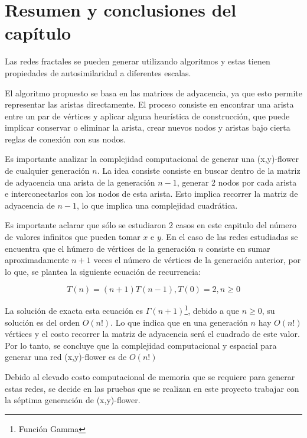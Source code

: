 \section{Resumen y conclusiones del capítulo}

Las redes fractales se pueden generar utilizando algoritmos y estas tienen propiedades de autosimilaridad a diferentes escalas.

El algoritmo propuesto se basa en las matrices de adyacencia, ya que esto permite representar las aristas directamente. El proceso consiste en encontrar una arista entre un par de vértices y aplicar alguna heurística de construcción, que puede implicar conservar o eliminar la arista, crear nuevos nodos y aristas bajo cierta reglas de conexión con sus nodos.

Es importante analizar la complejidad computacional de generar una (x,y)-flower de cualquier generación $n$. La idea consiste consiste en buscar dentro de la matriz de adyacencia una arista de la generación $n-1$, generar 2 nodos por cada arista e interconectarlos con los nodos de esta arista. Esto implica recorrer la matriz de adyacencia de $n-1$, lo que implica una complejidad cuadrática.

Es importante aclarar que sólo se estudiaron 2 casos en este capitulo del número de valores infinitos que pueden tomar $x$ e $y$. En el caso de las redes estudiadas se encuentra que el húmero de vértices de la generación $n$ consiste en sumar aproximadamente $n+1$ veces el número de vértices de la generación anterior, por lo que, se plantea la siguiente ecuación de recurrencia:

\begin{equation}
    T(n)=(n+1)T(n-1), T(0)=2, n \geq 0
\end{equation}

La solución de exacta esta ecuación es $\Gamma(n+1)$\footnote{Función Gamma}, debido a que $n\geq0$, su solución es del orden $O(n!)$. Lo que indica que en una generación $n$ hay $O(n!)$ vértices y el costo recorrer la matriz de adyacencia será el cuadrado de este valor. Por lo tanto, se concluye que la complejidad computacional y espacial para generar una red (x,y)-flower es de $O(n!)$

Debido al elevado costo computacional de memoria que se requiere para generar estas redes, se decide en las pruebas que se realizan en este proyecto trabajar con la séptima generación de (x,y)-flower.